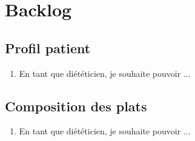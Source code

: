\section{Backlog}
\subsection{Profil patient}
\begin{enumerate}
\item En tant que diététicien, je souhaite pouvoir ...
\end{enumerate}

\subsection{Composition des plats}
\begin{enumerate}
\item En tant que diététicien, je souhaite pouvoir ...
\end{enumerate}
